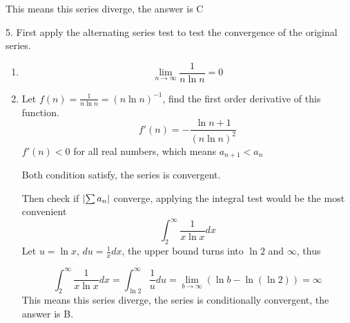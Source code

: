 \documentclass{article}
\numberwithin{equation}{section}
\begin{document}
This means this series diverge, the answer is C

5.  First apply the alternating series test to test the convergence of the original series.
\begin{enumerate}
    \item 
    \[
    \lim_{n\to\infty} \frac{1}{n\ln n} = 0
    \]
    \item Let $\displaystyle f(n) = \frac{1}{n\ln n} = (n\ln n)^{-1}$, find the first order derivative of this function.
    \[
    f'(n) = -\frac{\ln n + 1}{(n\ln n)^2}
    \]
    $f'(n) < 0$ for all real numbers, which means $a_{n+1} < a_n$

    Both condition satisfy, the series is convergent.

    Then check if $\abs{\sum a_n}$ converge, applying the integral test would be the most convenient
    \[
    \int_{2}^{\infty} \frac{1}{x\ln x} dx 
    \]
    Let $u = \ln x$, $\displaystyle du = \frac{1}{x} dx$, the upper bound turns into $\ln 2$ and $\infty$, thus

    \[
    \int_{2}^{\infty} \frac{1}{x\ln x} dx = \int_{\ln 2}^{\infty} \frac{1}{u} du = \lim_{b\to\infty} \left(\ln b - \ln (\ln 2)\right) = \infty
    \]
    This means this series diverge, the series is conditionally convergent, the answer is B.
\end{enumerate}
\end{document}
